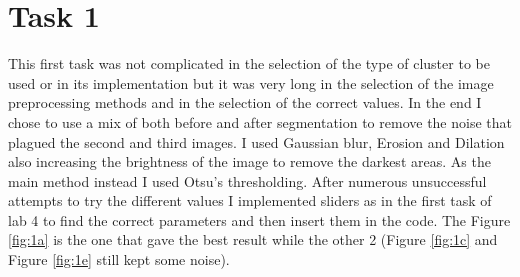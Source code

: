
%
%         

%





\chapter{Task 1}
This first task was not complicated in the selection of the type of cluster to be used or in its implementation but it was very long in the selection of the image preprocessing methods and in the selection of the correct values. In the end I chose to use a mix of both before and after segmentation to remove the noise that plagued the second and third images. I used Gaussian blur, Erosion and Dilation also increasing the brightness of the image to remove the darkest areas. As the main method instead I used Otsu’s thresholding. After numerous unsuccessful attempts to try the different values I implemented sliders as in the first task of lab 4 to find the correct parameters and then insert them in the code. The Figure \ref{fig:1a} is the one that gave the best result while the other 2 (Figure \ref{fig:1c} and Figure \ref{fig:1e} still kept some noise).

